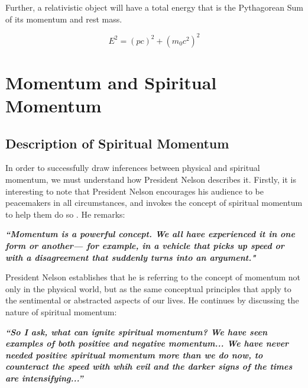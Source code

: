 \documentclass{article}
\begin{document}
            Further, a relativistic object will have a total energy that is the Pythagorean Sum of its momentum and rest mass.

            \begin{equation}\label{eq:8}
                E^2 = (pc)^2 + (m_0c^2)^2
            \end{equation}

\newpage
        
    \section{Momentum and Spiritual Momentum}
            
        \subsection{Description of Spiritual Momentum}

            In order to successfully draw inferences between physical and spiritual momentum, we must understand how President Nelson describes it.
            Firstly, it is interesting to note that President Nelson encourages his audience to be peacemakers in all circumstances, and invokes the concept of spiritual momentum to help them do so \cite{Nelson}. 
            He remarks: 

            \begin{center}
                \textbf{\textit{``Momentum is a powerful concept. 
                We all have experienced it in one form or another— for example, in a vehicle that picks up speed or with a disagreement that suddenly turns into an argument."
                }}
            \end{center}

            President Nelson establishes that he is referring to the concept of momentum not only in the physical world, but as the same conceptual principles that apply to the sentimental or abstracted aspects of our lives.
            He continues by discussing the nature of spiritual momentum:

            \begin{center}
                \textbf{\textit{``So I ask, what can ignite spiritual momentum? We have seen examples of both positive and negative momentum... 
                We have never needed positive spiritual momentum more than we do now, to counteract the speed with whih evil and the darker signs of the times are intensifying...''
                }}
            \end{center}
\end{document}
